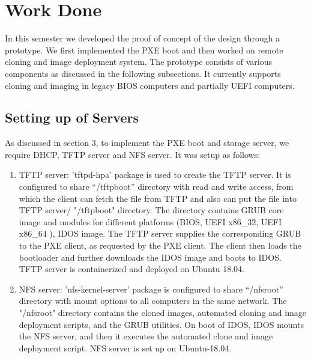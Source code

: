 \documentclass[a4paper,12pt]{article}
\begin{document}


\newpage
\section{\fontsize{16pt}{1em} Work Done}
In this semester we developed the proof of concept of the design through a prototype. We first implemented the PXE boot and then worked on remote cloning and image deployment system. The prototype consists of various components as discussed in the following subsections. It currently supports cloning and imaging in legacy BIOS computers and partially UEFI computers. 
\subsection{ Setting up of Servers}
As discussed in section 3, to implement the PXE boot and storage server, we require DHCP, TFTP server and NFS server. It was setup as follows:
\begin{enumerate}
    \item TFTP server: 'tftpd-hpa' package is used to create the TFTP server. It is configured to share  “/tftpboot” directory with read and write access, from which the client can fetch the file from TFTP and also can put the file into TFTP server/ "/tftpboot" directory. The directory contains  GRUB core image and modules for different platforms (BIOS,  UEFI x86\_32, UEFI x86\_64 ), IDOS image. The TFTP server supplies the corresponding GRUB to the PXE client, as requested by the PXE client. The client then loads the bootloader and further downloads the IDOS image and boots to IDOS. TFTP server is containerized and deployed on Ubuntu 18.04.
    \item  NFS server: 'nfs-kernel-server' package is configured to share “/nfsroot” directory with mount options to all computers in the same network. The "/nfsroot" directory contains the cloned images, automated cloning and image deployment scripts, and the GRUB utilities. On boot of IDOS, IDOS mounts the NFS server, and then it executes the automated clone and image deployment script. NFS server is set up on Ubuntu-18.04. 
\end{enumerate}
\end{document}
